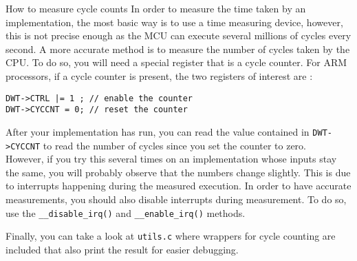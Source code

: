 \begin{bclogo}[couleur = gray!20, arrondi = 0.2, logo=\bcinfo]{How to measure cycle counts} In order to measure the time taken by an implementation, the most basic way is to use a time measuring device, however, this is not precise enough as the MCU can execute several millions of cycles every second. A more accurate method is to measure the number of cycles taken by the CPU. To do so, you will need a special register that is a cycle counter. For ARM processors, if a cycle counter is present, the two registers of interest are :
\begin{lstlisting}[style=customc]
DWT->CTRL |= 1 ; // enable the counter
DWT->CYCCNT = 0; // reset the counter
\end{lstlisting}
After your implementation has run, you can read the value contained in \texttt{DWT->CYCCNT} to read the number of cycles since you set the counter to zero.\\

However, if you try this several times on an implementation whose inputs stay the same, you will probably observe that the numbers change slightly. This is due to interrupts happening during the measured execution. In order to have accurate measurements, you should also disable interrupts during measurement. To do so, use the  \texttt{\_\_disable\_irq()} and \texttt{\_\_enable\_irq()} methods.

Finally, you can take a look at \texttt{utils.c} where wrappers for cycle counting are included that also print the result for easier debugging.
\end{bclogo}




